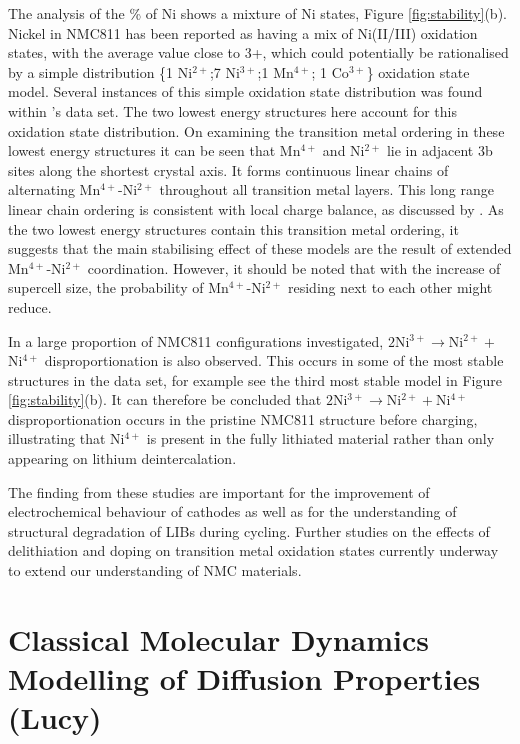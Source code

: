 \documentclass[aps,prb,twocolumn,superscriptaddress,reprint]{revtex4-1}
\begin{document}
The analysis of the \% of Ni shows a mixture of Ni states, Figure \ref{fig:stability}(b). Nickel in NMC811 has been reported as having a mix of Ni(II/III) oxidation states, with the average value close to 3+, \cite{Zhu_JMatChemA2019,Kondrakov_JPhysChemC2017} which could potentially be rationalised by a simple distribution \{1 Ni$^{2+}$;7 Ni$^{3+}$;1 Mn$^{4+}$; 1 Co$^{3+}$\} oxidation state model. Several instances of this simple oxidation state distribution was found within \citeauthor{rana}'s data set. The two lowest energy structures here account for this oxidation state distribution. On examining the transition metal ordering in these lowest energy structures it can be seen that Mn$^{4+}$ and Ni$^{2+}$ lie in adjacent 3b sites along the shortest crystal axis. It forms continuous linear chains of alternating Mn$^{4+}$-Ni$^{2+}$ throughout all transition metal layers. This long range linear chain ordering is consistent with local charge balance, as discussed by \citeauthor{Zeng_ChemMater2007} \cite{Zeng_ChemMater2007}. As the two lowest energy structures contain this transition metal ordering, it suggests that the main stabilising effect of these models are the result of extended Mn$^{4+}$-Ni$^{2+}$ coordination. However, it should be noted that with the increase of supercell size, the probability of Mn$^{4+}$-Ni$^{2+}$ residing next to each other might reduce.

In a large proportion of NMC811 configurations \citeauthor{rana} investigated, $2$Ni$^{3+}\rightarrow$Ni$^{2+} + $Ni$^{4+}$ disproportionation is also observed. This occurs in some of the most stable structures in the data set, for example see the third most stable model in Figure \ref{fig:stability}(b). It can therefore be concluded that $2$Ni$^{3+}\rightarrow$Ni$^{2+} + $Ni$^{4+}$ disproportionation occurs in the pristine NMC811 structure before charging, illustrating that Ni$^{4+}$ is present in the fully lithiated material rather than only appearing on lithium deintercalation.

The finding from these studies are important for the improvement of electrochemical behaviour of cathodes as well as for the understanding of structural degradation of LIBs during cycling. Further studies on the effects of delithiation and doping on transition metal oxidation states currently underway to extend our understanding of NMC materials.

\section{Classical Molecular Dynamics Modelling of Diffusion Properties (Lucy)}
\end{document}
